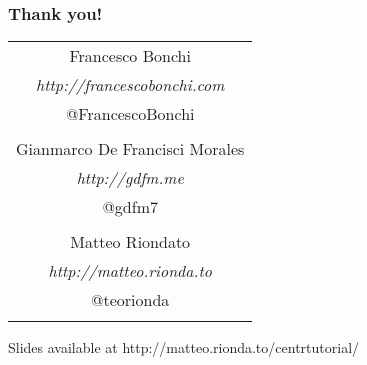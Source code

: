 \begin{frame}
  \frametitle{\bigskip \bigskip  \Huge Thank you!}
  \centering
  \begin{tabular}{c}
    Francesco Bonchi \\  \emph{http://francescobonchi.com} \\ @FrancescoBonchi\\ $\;$ \\
    Gianmarco De Francisci Morales \\ \emph{http://gdfm.me} \\  @gdfm7\\  $\;$ \\
    Matteo Riondato \\ \emph{http://matteo.rionda.to} \\ @teorionda\\  $\;$ \\
  \end{tabular}
  \begin{block}{\centering Slides available at}
    \centering  http://matteo.rionda.to/centrtutorial/
  \end{block}
\end{frame}

